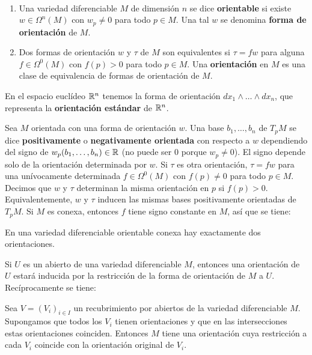 \documentclass[CV.tex]{subfiles}
\begin{document}
\begin{defi}\
\begin{enumerate}
\item Una variedad diferenciable $M$ de dimensión $n$ se dice \textbf{orientable} si existe $w\in\Omega^n(M)$ con $w_p\neq 0$ para todo $p\in M$. Una tal $w$ se denomina \textbf{forma de orientación} de $M$.
\item Dos formas de orientación $w$ y $\tau$ de $M$ son equivalentes si $\tau=fw$ para alguna $f\in\Omega^0(M)$ con $f(p)>0$ para todo $p\in M$. Una \textbf{orientación} en $M$ es una clase de equivalencia de formas de orientación de $M$. 
\end{enumerate}
\end{defi}

En el espacio euclídeo $\mathbb{R}^n$ tenemos la forma de orientación $dx_1\land\dots\land dx_n$, que representa la \textbf{orientación estándar} de $\mathbb{R}^n$. 

Sea $M$ orientada con una forma de orientación $w$. Una base $b_1,\dots, b_n$ de $T_pM$ se dice \textbf{positivamente} o \textbf{negativamente  orientada} con respecto a $w$ dependiendo del signo de $w_p(b_1,\dots, b_n)\in\mathbb{R}$ (no puede ser 0 porque $w_p\neq 0$). El signo depende solo de la orientación determinada por $w$. Si $\tau$ es otra orientación, $\tau=fw$ para una unívocamente determinada $f\in\Omega^0(M)$ con $f(p)\neq 0$ para todo $p\in M$. Decimos que $w$ y $\tau$ determinan la misma orientación en $p$ si $f(p)>0$. Equivalentemente, $w$ y $\tau$ inducen las mismas bases positivamente orientadas de $T_pM$. Si $M$ es conexa, entonces $f$ tiene signo constante en $M$, así que se tiene:

\begin{lemma}
En una variedad diferenciable orientable conexa hay exactamente dos orientaciones.
\end{lemma}

Si $U$ es un abierto de una variedad diferenciable $M$, entonces una orientación de $U$ estará inducida por la restricción de la forma de orientación de $M$ a $U$. Recíprocamente se tiene:

\begin{lemma}
Sea $V=(V_i)_{i\in I}$ un recubrimiento por abiertos de la variedad diferenciable $M$. Supongamos que todos los $V_i$ tienen orientaciones y que en las intersecciones estas orientaciones coinciden. Entonces $M$ tiene una orientación cuya restricción a cada $V_i$ coincide con la orientación original de $V_i$. 
\end{lemma}
\end{document}
